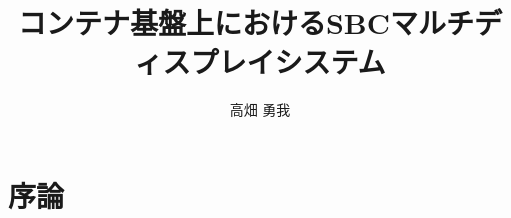 \documentclass[12pt,a4paper]{jbook}
\title{コンテナ基盤上におけるSBCマルチディスプレイシステム}
\author{高畑 勇我}
\begin{document}
\coverpage

\tableofcontents

\body

\chapter{序論}













\end{document}
